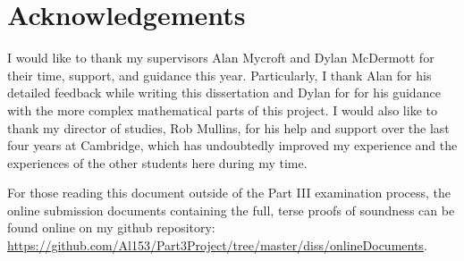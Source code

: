 \chapter*{Acknowledgements}

I would like to thank my supervisors Alan Mycroft and Dylan McDermott for their time, support, and guidance this year. Particularly, I thank Alan for his detailed feedback while writing this dissertation and Dylan for for his guidance with the more complex mathematical parts of this project.
I would also like to thank my director of studies, Rob Mullins, for his help and support over the last four years at Cambridge, which has undoubtedly improved my experience and the experiences of the other students here during my time.


For those reading this document outside of the Part III examination process, the online submission documents containing the full, terse proofs of soundness can be found online on my github repository: \url{https://github.com/Al153/Part3Project/tree/master/diss/onlineDocuments}.


\clearpage